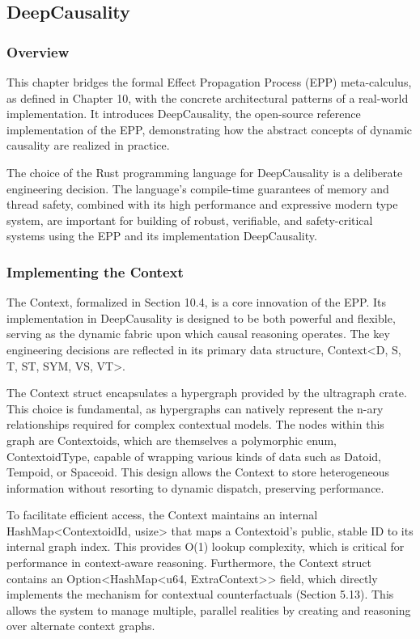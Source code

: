 \subsection{DeepCausality}
\label{sec:implementation_deep_causality}


\subsubsection{Overview}
\label{sec:implementation_overview}

This chapter bridges the formal Effect Propagation Process (EPP) meta-calculus, as defined in Chapter 10,
with the concrete architectural patterns of a real-world implementation. It introduces DeepCausality,
the open-source reference implementation of the EPP, demonstrating how the abstract concepts of dynamic causality are realized in practice.

The choice of the Rust programming language for DeepCausality is a deliberate engineering decision.
The language's compile-time guarantees of memory and thread safety, combined with its high performance
and expressive modern type system, are important for building of robust, verifiable,
and safety-critical systems using the EPP and its implementation DeepCausality.

\subsubsection{Implementing the Context}
\label{sec:implementation_context}

The Context, formalized in Section 10.4, is a core innovation of the EPP. Its implementation in DeepCausality is designed to be both powerful and flexible, serving as the dynamic fabric upon which causal reasoning operates. The key engineering decisions are reflected in its primary data structure, Context<D, S, T, ST, SYM, VS, VT>.

The Context struct encapsulates a hypergraph provided by the ultragraph crate. This choice is fundamental, as hypergraphs can natively represent the n-ary relationships required for complex contextual models. The nodes within this graph are Contextoids, which are themselves a polymorphic enum, ContextoidType, capable of wrapping various kinds of data such as Datoid, Tempoid, or Spaceoid. This design allows the Context to store heterogeneous information without resorting to dynamic dispatch, preserving performance.

To facilitate efficient access, the Context maintains an internal HashMap<ContextoidId, usize> that maps a Contextoid's public, stable ID to its internal graph index. This provides O(1) lookup complexity, which is critical for performance in context-aware reasoning. Furthermore, the Context struct contains an Option<HashMap<u64, ExtraContext>> field, which directly implements the mechanism for contextual counterfactuals (Section 5.13). This allows the system to manage multiple, parallel realities by creating and reasoning over alternate context graphs.

